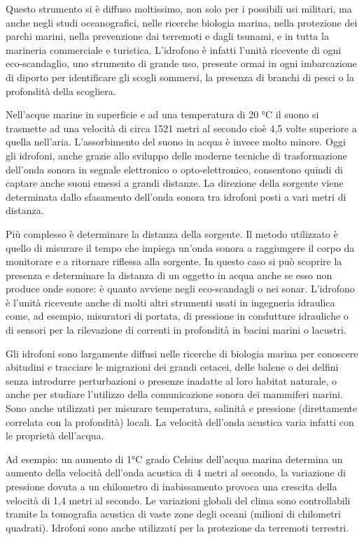 Questo strumento si è diffuso moltissimo, non solo per i possibili usi militari, ma anche negli studi oceanografici, nelle ricerche biologia marina, nella protezione dei parchi marini, nella prevenzione dai terremoti e dagli tsunami, e in tutta la marineria commerciale e turistica. L’idrofono è infatti l’unità ricevente di ogni eco-scandaglio, uno strumento di grande uso, presente ormai in ogni imbarcazione di diporto per identificare gli scogli sommersi, la presenza di branchi di pesci o la profondità della scogliera.

Nell’acque marine in superficie e ad una temperatura di 20 °C il suono si trasmette ad una velocità di circa 1521 metri al secondo cioè 4,5 volte superiore a quella nell'aria. 
L’assorbimento del suono in acqua è invece molto minore. 
Oggi gli idrofoni, anche grazie allo sviluppo delle moderne tecniche di trasformazione dell’onda sonora in segnale elettronico o opto-elettronico, consentono quindi di captare anche suoni emessi a grandi distanze. 
La direzione della sorgente viene determinata dallo sfasamento dell’onda sonora tra idrofoni posti a vari metri di distanza.

Più complesso è determinare la distanza della sorgente.
 Il metodo utilizzato è quello di misurare il tempo che impiega un’onda sonora a raggiungere il corpo da monitorare e a ritornare riflessa alla sorgente. 
In questo caso si può scoprire la presenza e determinare la distanza di un oggetto in acqua anche se esso non produce onde sonore: è quanto avviene negli eco-scandagli o nei sonar. 
L’idrofono è l’unità ricevente anche di molti altri strumenti usati in ingegneria idraulica come, ad esempio, misuratori di portata, di pressione in condutture idrauliche o di sensori per la rilevazione di correnti in profondità in bacini marini o lacustri.

Gli idrofoni sono largamente diffusi nelle ricerche di biologia marina per conoscere abitudini e tracciare le migrazioni dei grandi cetacei, delle balene o dei delfini senza introdurre perturbazioni o presenze inadatte al loro habitat naturale, o anche per studiare l’utilizzo della comunicazione sonora dei mammiferi marini. 
Sono anche utilizzati per misurare temperatura, salinità e pressione (direttamente correlata con la profondità) locali. 
La velocità dell’onda acustica varia infatti con le proprietà dell’acqua. 

Ad esempio: un aumento di 1°C grado Celsius dell’acqua marina determina un aumento della velocità dell’onda acustica di 4 metri al secondo, la variazione di pressione dovuta a un chilometro di inabissamento provoca una crescita della velocità di 1,4 metri al secondo. 
Le variazioni globali del clima sono controllabili tramite la tomografia acustica di vaste zone degli oceani (milioni di chilometri quadrati). Idrofoni sono anche utilizzati per la protezione da terremoti terrestri. 

